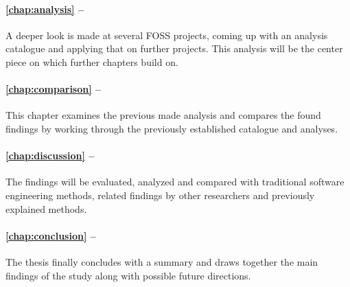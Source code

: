 \paragraph{\autoref{chap:analysis} -- }

A deeper look is made at several \ac{FOSS} projects, coming up with an analysis
catalogue and applying that on further projects. This analysis will be the
center piece on which further chapters build on.

\paragraph{\autoref{chap:comparison} -- }

This chapter examines the previous made analysis and compares the found
findings by working through the previously established catalogue and analyses.

\paragraph{\autoref{chap:discussion} -- }

The findings will be evaluated, analyzed and compared with traditional software
engineering methods, related findings by other researchers and previously
explained methods.

\paragraph{\autoref{chap:conclusion} -- }

The thesis finally concludes with a summary and draws together the main
findings of the study along with possible future directions.



